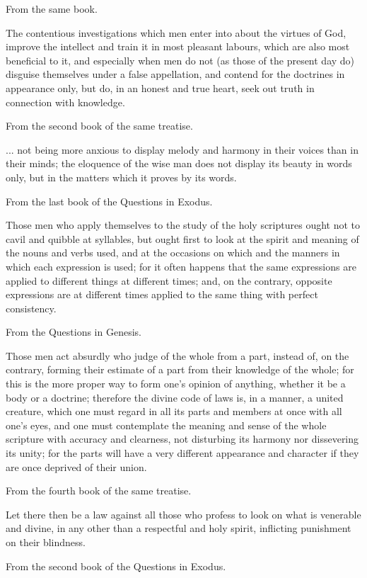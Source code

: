 From the same book.

The contentious investigations which men enter into about the virtues of God, improve the intellect
and train it in most pleasant labours, which are also most beneficial to it, and especially when men
do not (as those of the present day do) disguise themselves under a false appellation, and contend
for the doctrines in appearance only, but do, in an honest and true heart, seek out truth in
connection with knowledge.

From the second book of the same treatise.

... not being more anxious to display melody and harmony in their voices than in their minds; the
eloquence of the wise man does not display its beauty in words only, but in the matters which it
proves by its words.

From the last book of the Questions in Exodus.

Those men who apply themselves to the study of the holy scriptures ought not to cavil and quibble
at syllables, but ought first to look at the spirit and meaning of the nouns and verbs used, and at the
occasions on which and the manners in which each expression is used; for it often happens that
the same expressions are applied to different things at different times; and, on the contrary,
opposite expressions are at different times applied to the same thing with perfect consistency.

From the Questions in Genesis.

Those men act absurdly who judge of the whole from a part, instead of, on the contrary, forming
their estimate of a part from their knowledge of the whole; for this is the more proper way to form
one's opinion of anything, whether it be a body or a doctrine; therefore the divine code of laws is, in
a manner, a united creature, which one must regard in all its parts and members at once with all
one's eyes, and one must contemplate the meaning and sense of the whole scripture with
accuracy and clearness, not disturbing its harmony nor dissevering its unity; for the parts will have
a very different appearance and character if they are once deprived of their union.

From the fourth book of the same treatise.

Let there then be a law against all those who profess to look on what is venerable and divine, in
any other than a respectful and holy spirit, inflicting punishment on their blindness.

From the second book of the Questions in Exodus.

